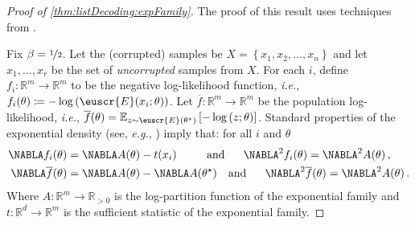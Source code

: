 \documentclass[11pt]{article}
\theoremstyle{plain}
\theoremstyle{definition}
\theoremstyle{remark}
\newcommand{\quadtext}[1]{\quad\text{#1}\quad}
\newcommand{\quadand}{\quadtext{and}}
\newcommand{\inbrace}[1]{\left\{#1\right\}}
\newcommand{\inparen}[1]{\left(#1\right)}
\newcommand{\insquare}[1]{\left[#1\right]}
\newcommand{\R}{\mathbb{R}}
\newcommand{\E}{\operatornamewithlimits{\mathbb{E}}}
\newcommand{\Ex}{\E}
\newcommand{\nfrac}[2]{\nicefrac{#1}{#2}}
\newcommand*{\Nabla}{\boldsymbol\NABLA}
\let\nabla\Nabla
\newcommand{\customcal}[1]{\euscr{#1}}
\newcommand{\cE}{\customcal{E}}
\newcommand{\ie}{\textit{i.e.}}
\newcommand{\eg}{\textit{e.g.}}
\begin{document}
            \begin{proof}[Proof of \cref{thm:listDecoding:expFamily}]
                The proof of this result uses techniques from \citet{charikar2017learning}.
            
                
                Fix $\beta= \nfrac{1}{2}$. %
                Let the (corrupted) samples be $X=\inbrace{x_1,x_2,\dots,x_n}$ and let $x_1,\dots,x_{r}$ be the set of \textit{uncorrupted} samples from $X$.
                For each $i$, define $f_i\colon \R^m\to \R^m$ to be the negative log-likelihood function, \ie{}, 
                $f_i(\theta) \coloneqq -\log\inparen{\cE(x_i; \theta)}$.
                Let $\overline{f}\colon \R^m \to \R^m$ be the population log-likelihood, \ie{}, $\overline{f}(\theta)=\Ex_{z\sim \cE(\theta^\star)}\insquare{-\log\inparen{z;\theta}}$.
                Standard properties of the exponential density (see, \eg{}, \citet{dasgupta2008asymptotic}) imply that:
                for all $i$ and $\theta$
                \begin{align*}
                    \nabla f_i(\theta) &= \nabla A(\theta) - t(x_i)
                    ~~\quad\quadand~~
                    \nabla^2 f_i(\theta) = \nabla^2 A(\theta)\,,\\
                    \nabla \overline{f}(\theta) &= \nabla A(\theta) - \nabla A(\theta^\star)
                    \quadand~~
                    \nabla^2 \overline{f}(\theta) = \nabla^2 A(\theta)\,.
                \end{align*}
                Where $A\colon \R^m \to \R_{>0}$ is the log-partition function of the exponential family and $t\colon \R^d\to \R^m$ is the sufficient statistic of the exponential family.
                

\end{proof}
\end{document}
